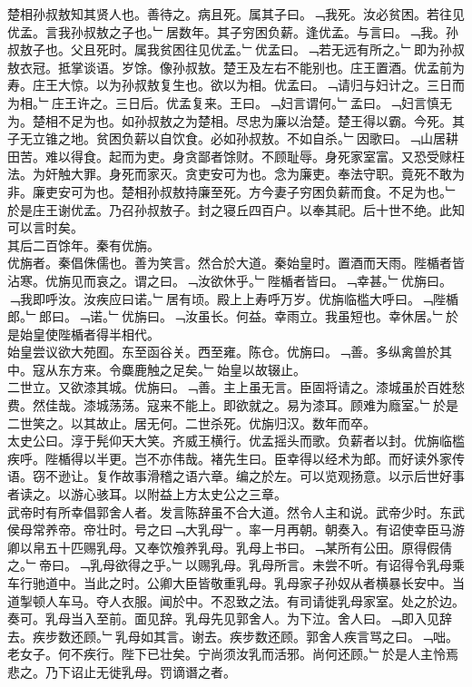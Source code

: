 \documentclass{zhvt-classic}
\begin{document}
\hspace*{2em}楚相孙叔敖知其贤人也。善待之。病且死。属其子曰。﹁我死。汝必贫困。若往见优孟。言我孙叔敖之子也。﹂居数年。其子穷困负薪。逢优孟。与言曰。﹁我。孙叔敖子也。父且死时。属我贫困往见优孟。﹂优孟曰。﹁若无远有所之。﹂即为孙叔敖衣冠。抵掌谈语。岁馀。像孙叔敖。楚王及左右不能别也。庄王置酒。优孟前为寿。庄王大惊。以为孙叔敖复生也。欲以为相。优孟曰。﹁请归与妇计之。三日而为相。﹂庄王许之。三日后。优孟复来。王曰。﹁妇言谓何。﹂孟曰。﹁妇言慎无为。楚相不足为也。如孙叔敖之为楚相。尽忠为廉以治楚。楚王得以霸。今死。其子无立锥之地。贫困负薪以自饮食。必如孙叔敖。不如自杀。﹂因歌曰。﹁山居耕田苦。难以得食。起而为吏。身贪鄙者馀财。不顾耻辱。身死家室富。又恐受赇枉法。为奸触大罪。身死而家灭。贪吏安可为也。念为廉吏。奉法守职。竟死不敢为非。廉吏安可为也。楚相孙叔敖持廉至死。方今妻子穷困负薪而食。不足为也。﹂於是庄王谢优孟。乃召孙叔敖子。封之寝丘四百户。以奉其祀。后十世不绝。此知可以言时矣。\\
\hspace*{2em}其后二百馀年。秦有优旃。\\
\hspace*{2em}优旃者。秦倡侏儒也。善为笑言。然合於大道。秦始皇时。置酒而天雨。陛楯者皆沾寒。优旃见而哀之。谓之曰。﹁汝欲休乎。﹂陛楯者皆曰。﹁幸甚。﹂优旃曰。﹁我即呼汝。汝疾应曰诺。﹂居有顷。殿上上寿呼万岁。优旃临槛大呼曰。﹁陛楯郎。﹂郎曰。﹁诺。﹂优旃曰。﹁汝虽长。何益。幸雨立。我虽短也。幸休居。﹂於是始皇使陛楯者得半相代。\\
\hspace*{2em}始皇尝议欲大苑囿。东至函谷关。西至雍。陈仓。优旃曰。﹁善。多纵禽兽於其中。寇从东方来。令麋鹿触之足矣。﹂始皇以故辍止。\\
\hspace*{2em}二世立。又欲漆其城。优旃曰。﹁善。主上虽无言。臣固将请之。漆城虽於百姓愁费。然佳哉。漆城荡荡。寇来不能上。即欲就之。易为漆耳。顾难为廕室。﹂於是二世笑之。以其故止。居无何。二世杀死。优旃归汉。数年而卒。\\
\hspace*{2em}太史公曰。淳于髡仰天大笑。齐威王横行。优孟摇头而歌。负薪者以封。优旃临槛疾呼。陛楯得以半更。岂不亦伟哉。褚先生曰。臣幸得以经术为郎。而好读外家传语。窃不逊让。复作故事滑稽之语六章。编之於左。可以览观扬意。以示后世好事者读之。以游心骇耳。以附益上方太史公之三章。\\
\hspace*{2em}武帝时有所幸倡郭舍人者。发言陈辞虽不合大道。然令人主和说。武帝少时。东武侯母常养帝。帝壮时。号之曰﹁大乳母﹂。率一月再朝。朝奏入。有诏使幸臣马游卿以帛五十匹赐乳母。又奉饮飧养乳母。乳母上书曰。﹁某所有公田。原得假倩之。﹂帝曰。﹁乳母欲得之乎。﹂以赐乳母。乳母所言。未尝不听。有诏得令乳母乘车行驰道中。当此之时。公卿大臣皆敬重乳母。乳母家子孙奴从者横暴长安中。当道掣顿人车马。夺人衣服。闻於中。不忍致之法。有司请徙乳母家室。处之於边。奏可。乳母当入至前。面见辞。乳母先见郭舍人。为下泣。舍人曰。﹁即入见辞去。疾步数还顾。﹂乳母如其言。谢去。疾步数还顾。郭舍人疾言骂之曰。﹁咄。老女子。何不疾行。陛下已壮矣。宁尚须汝乳而活邪。尚何还顾。﹂於是人主怜焉悲之。乃下诏止无徙乳母。罚谪谮之者。\\
\end{document}
